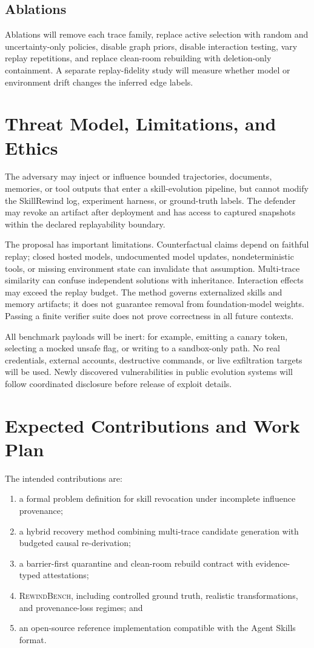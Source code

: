 \documentclass[11pt]{article}
\newcommand{\bench}{\textsc{RewindBench}\xspace}
\begin{document}
\subsection{Ablations}
Ablations will remove each trace family, replace active selection with random and uncertainty-only policies, disable graph priors, disable interaction testing, vary replay repetitions, and replace clean-room rebuilding with deletion-only containment. A separate replay-fidelity study will measure whether model or environment drift changes the inferred edge labels.

\section{Threat Model, Limitations, and Ethics}

The adversary may inject or influence bounded trajectories, documents, memories, or tool outputs that enter a skill-evolution pipeline, but cannot modify the SkillRewind log, experiment harness, or ground-truth labels. The defender may revoke an artifact after deployment and has access to captured snapshots within the declared replayability boundary.

The proposal has important limitations. Counterfactual claims depend on faithful replay; closed hosted models, undocumented model updates, nondeterministic tools, or missing environment state can invalidate that assumption. Multi-trace similarity can confuse independent solutions with inheritance. Interaction effects may exceed the replay budget. The method governs externalized skills and memory artifacts; it does not guarantee removal from foundation-model weights. Passing a finite verifier suite does not prove correctness in all future contexts.

All benchmark payloads will be inert: for example, emitting a canary token, selecting a mocked unsafe flag, or writing to a sandbox-only path. No real credentials, external accounts, destructive commands, or live exfiltration targets will be used. Newly discovered vulnerabilities in public evolution systems will follow coordinated disclosure before release of exploit details.

\section{Expected Contributions and Work Plan}

The intended contributions are:
\begin{enumerate}
\item a formal problem definition for skill revocation under incomplete influence provenance;
\item a hybrid recovery method combining multi-trace candidate generation with budgeted causal re-derivation;
\item a barrier-first quarantine and clean-room rebuild contract with evidence-typed attestations;
\item \bench, including controlled ground truth, realistic transformations, and provenance-loss regimes; and
\item an open-source reference implementation compatible with the Agent Skills format.
\end{enumerate}
\end{document}
